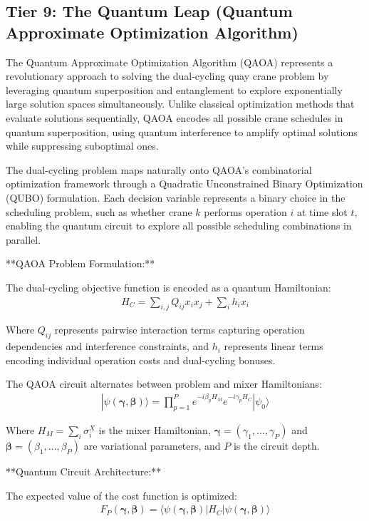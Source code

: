 \documentclass{article}
\begin{document}
\subsection{Tier 9: The Quantum Leap (Quantum Approximate Optimization Algorithm)}

The Quantum Approximate Optimization Algorithm (QAOA) represents a revolutionary approach to solving the dual-cycling quay crane problem by leveraging quantum superposition and entanglement to explore exponentially large solution spaces simultaneously. Unlike classical optimization methods that evaluate solutions sequentially, QAOA encodes all possible crane schedules in quantum superposition, using quantum interference to amplify optimal solutions while suppressing suboptimal ones.

The dual-cycling problem maps naturally onto QAOA's combinatorial optimization framework through a Quadratic Unconstrained Binary Optimization (QUBO) formulation. Each decision variable represents a binary choice in the scheduling problem, such as whether crane $k$ performs operation $i$ at time slot $t$, enabling the quantum circuit to explore all possible scheduling combinations in parallel.

**QAOA Problem Formulation:**

The dual-cycling objective function is encoded as a quantum Hamiltonian:
\begin{align}
H_C = \sum_{i,j} Q_{ij} x_i x_j + \sum_i h_i x_i
\end{align}

Where $Q_{ij}$ represents pairwise interaction terms capturing operation dependencies and interference constraints, and $h_i$ represents linear terms encoding individual operation costs and dual-cycling bonuses.

The QAOA circuit alternates between problem and mixer Hamiltonians:
\begin{align}
|\psi(\boldsymbol{\gamma}, \boldsymbol{\beta})\rangle = \prod_{p=1}^P e^{-i\beta_p H_M} e^{-i\gamma_p H_C} |\psi_0\rangle
\end{align}

Where $H_M = \sum_i \sigma_i^X$ is the mixer Hamiltonian, $\boldsymbol{\gamma} = (\gamma_1, \ldots, \gamma_P)$ and $\boldsymbol{\beta} = (\beta_1, \ldots, \beta_P)$ are variational parameters, and $P$ is the circuit depth.

**Quantum Circuit Architecture:**

The expected value of the cost function is optimized:
\begin{align}
F_P(\boldsymbol{\gamma}, \boldsymbol{\beta}) = \langle\psi(\boldsymbol{\gamma}, \boldsymbol{\beta})| H_C |\psi(\boldsymbol{\gamma}, \boldsymbol{\beta})\rangle
\end{align}
\end{document}
